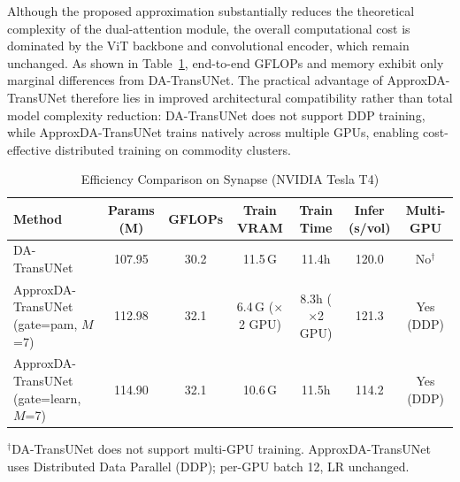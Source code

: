 Although the proposed approximation substantially reduces the theoretical complexity of the dual-attention module, the overall computational cost is dominated by the ViT backbone and convolutional encoder, which remain unchanged. As shown in Table~\ref{tab:efficiency}, end-to-end GFLOPs and memory exhibit only marginal differences from DA-TransUNet. The practical advantage of ApproxDA-TransUNet therefore lies in improved architectural compatibility rather than total model complexity reduction: DA-TransUNet does not support DDP training, while ApproxDA-TransUNet trains natively across multiple GPUs, enabling cost-effective distributed training on commodity clusters.

\begin{table}[ht]
  \caption{Efficiency Comparison on Synapse (NVIDIA Tesla T4)}
  \label{tab:efficiency}
  \begin{center}
  \setlength{\tabcolsep}{5pt}
  \begin{tabular}{lcccccc}
    \toprule
    Method & Params (M) & GFLOPs & Train VRAM & Train Time & Infer (s/vol) & Multi-GPU \\
    \midrule
    DA-TransUNet~\cite{sun2024datransunet} & 107.95 & 30.2 & 11.5\,G & 11.4h & 120.0 & No$^\dagger$ \\
    \midrule
    ApproxDA-TransUNet (gate=pam, $M$=7)  & 112.98 & 32.1 & 6.4\,G ($\times$2 GPU) & 8.3h ($\times$2 GPU) & 121.3 & Yes (DDP) \\
    ApproxDA-TransUNet (gate=learn, $M$=7) & 114.90 & 32.1 & 10.6\,G & 11.5h & 114.2 & Yes (DDP) \\
    \bottomrule
  \end{tabular}
  \end{center}
  \vspace{-0.3em}
  \footnotesize{$^\dagger$DA-TransUNet does not support multi-GPU training. ApproxDA-TransUNet uses Distributed Data Parallel (DDP); per-GPU batch 12, LR unchanged.}
\end{table}
